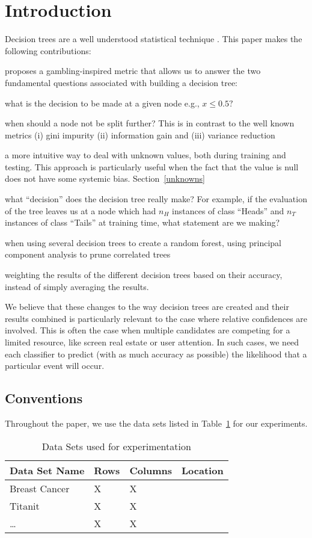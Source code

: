 
\section{Introduction}

Decision trees are a well understood statistical technique \cite{Hastie2009}.
This paper makes the following contributions:
\be
\item proposes a gambling-inspired metric that allows us to answer
the two fundamental questions associated with building a decision tree:
\be
\item what is the decision to be made at a given node e.g., \(x \leq 0.5?\)
\item when should a node not be split further?
\ee
This is in contrast to the well known metrics (i) gini impurity (ii) information
gain and (iii) variance reduction
\item a more intuitive way to deal with unknown values, both during 
training and testing. This approach is particularly useful when
the fact that the value is null does not have some systemic bias.
Section~\ref{unknowns}
\item what ``decision'' does the decision tree really make? For example, if the
evaluation of the tree leaves us at a node which had 
\(n_H\) instances of class ``Heads'' and 
\(n_T\) instances of class ``Tails'' at training time, what statement are we
making?
\item when using several decision trees to create a random forest, using
principal component analysis to prune correlated trees
\item weighting the results of the different decision trees based 
on their accuracy, instead of simply averaging the results.
\ee

We believe that these changes to the way decision trees are created and their
results combined is particularly relevant to the case where relative
confidences are involved. This is often the case when multiple candidates are
competing for a limited resource, like screen real estate or user attention. In
such cases, we need each classifier to predict (with as much accuracy as
possible) the likelihood that a particular event will occur.

\subsection{Conventions}
Throughout the paper, we use the data sets listed in Table~\ref{tbl_data_sets}
for our experiments. 
\begin{table}
\centering
\begin{tabular}{|l|l|l|l|} \hline \hline
{\bf Data Set Name } & {\bf Rows} & {\bf Columns} & {\bf Location} \\ \hline 
Breast Cancer & X & X & \\ \hline
Titanit & X & X & \\ \hline
\ldots & X & X & \\ \hline
\end{tabular}
\label{tbl_data_sets}
\caption{Data Sets used for experimentation}
\end{table}

